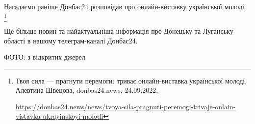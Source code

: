 Нагадаємо раніше Донбас24 розповідав про \href{https://donbas24.news/news/tvoya-sila-pragnuti-peremogi-trivaje-onlain-vistavka-ukrayinskoyi-molodi}{онлайн-виставку української молоді}.%
\footnote{Твоя сила — прагнути перемоги: триває онлайн-виставка української молоді, Алевтина Швецова, donbas24.news, 24.09.2022, \par%
\url{https://donbas24.news/news/tvoya-sila-pragnuti-peremogi-trivaje-onlain-vistavka-ukrayinskoyi-molodi}%
}

Ще більше новин та найактуальніша інформація про Донецьку та Луганську області
в нашому телеграм-каналі Донбас24.

ФОТО: з відкритих джерел

